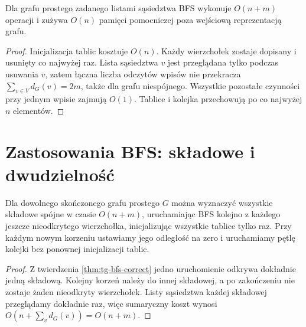 \begin{stwierdzenie}
\label{prop:tg-bfs-complexity}
Dla grafu prostego zadanego listami sąsiedztwa BFS
wykonuje $O(n+m)$ operacji i zużywa $O(n)$
pamięci pomocniczej poza wejściową reprezentacją grafu.
\end{stwierdzenie}
\begin{proof}
Inicjalizacja tablic kosztuje $O(n)$.
Każdy wierzchołek zostaje dopisany i usunięty
co najwyżej raz. Lista sąsiedztwa $v$
jest przeglądana tylko podczas usuwania $v$,
zatem łączna liczba odczytów wpisów nie przekracza
$\sum_{v\in V}d_G(v)=2m$, także dla grafu niespójnego.
Wszystkie pozostałe czynności przy jednym wpisie
zajmują $O(1)$. Tablice i kolejka przechowują po
co najwyżej $n$ elementów.
\end{proof}

\section{Zastosowania BFS: składowe i dwudzielność}
\label{sec:tg-bfs-applications}

\begin{twierdzenie}
\label{thm:tg-components-algo}
Dla dowolnego skończonego grafu prostego $G$ można
wyznaczyć wszystkie składowe spójne w czasie $O(n+m)$,
uruchamiając BFS kolejno z każdego jeszcze
nieodkrytego wierzchołka, inicjalizując wszystkie tablice tylko raz.
Przy każdym nowym korzeniu ustawiamy jego odległość na zero
i uruchamiamy pętlę kolejki bez ponownej inicjalizacji tablic.
\end{twierdzenie}
\begin{proof}
Z twierdzenia \ref{thm:tg-bfs-correct} jedno uruchomienie
odkrywa dokładnie jedną składową. Kolejny korzeń
należy do innej składowej, a po zakończeniu
nie zostaje żaden nieodkryty wierzchołek.
Listy sąsiedztwa każdej składowej przeglądamy
dokładnie raz, więc sumaryczny koszt wynosi
$O(n+\sum_v d_G(v))=O(n+m)$.
\end{proof}

